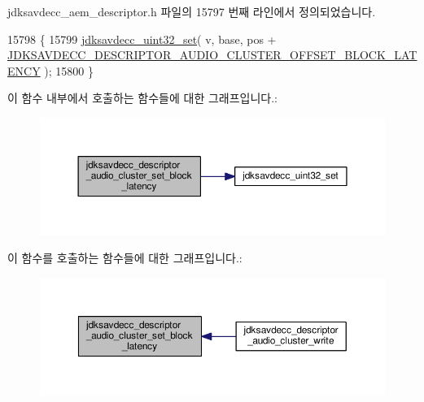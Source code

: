 jdksavdecc\+\_\+aem\+\_\+descriptor.\+h 파일의 15797 번째 라인에서 정의되었습니다.


\begin{DoxyCode}
15798 \{
15799     \hyperlink{group__endian_ga59b24ae6f7f47ca4d24ea337543162bf}{jdksavdecc\_uint32\_set}( v, base, pos + 
      \hyperlink{group__descriptor__audio__cluster_gafe4912a6994a34ed707bb8dd8aac53a6}{JDKSAVDECC\_DESCRIPTOR\_AUDIO\_CLUSTER\_OFFSET\_BLOCK\_LATENCY}
       );
15800 \}
\end{DoxyCode}


이 함수 내부에서 호출하는 함수들에 대한 그래프입니다.\+:
\nopagebreak
\begin{figure}[H]
\begin{center}
\leavevmode
\includegraphics[width=350pt]{group__descriptor__audio__cluster_gaaf74c6f91f3808ce1ee102dd85379817_cgraph}
\end{center}
\end{figure}




이 함수를 호출하는 함수들에 대한 그래프입니다.\+:
\nopagebreak
\begin{figure}[H]
\begin{center}
\leavevmode
\includegraphics[width=350pt]{group__descriptor__audio__cluster_gaaf74c6f91f3808ce1ee102dd85379817_icgraph}
\end{center}
\end{figure}


